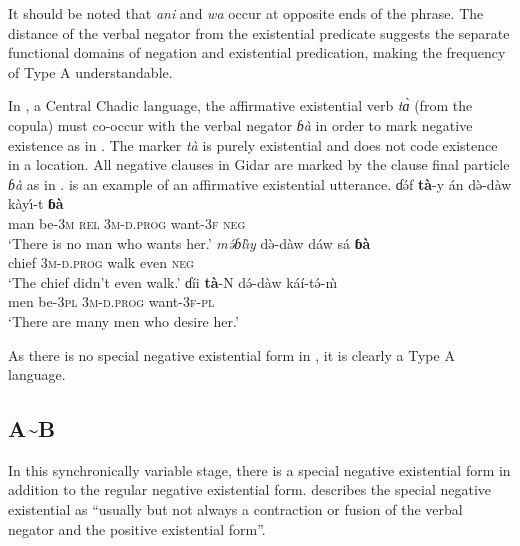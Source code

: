 \documentclass[output=paper]{langsci/langscibook}
\begin{document}
It should be noted that \textit{ani} and \textit{wa} occur at opposite ends of the phrase. The distance of the verbal negator from the existential predicate suggests the separate functional domains of negation and existential predication, making the frequency of Type A understandable.

In , a Central Chadic language, the affirmative existential verb \textit{t\`ɑ} (from the copula) must co-occur with the verbal negator \textit{ɓ\`a} in order to mark negative existence as in . The marker \textit{t\`a} is purely existential and does not code existence in a location. All negative clauses in Gidar are marked by the clause final particle \textit{ɓ\`a} as in .  is an example of an affirmative existential utterance.
\ea\label{ex:gidar-want-chief-desire}
\ea\label{ex:gidar-want}
\gll ɗ\'əf \textbf{t\`a}-y \'an d\`ə-d\`aw k\`ay\'\i-t \textbf{ɓ\`a}\\
man be-3\textsc{m} \textsc{rel} 3\textsc{m}-\textsc{d.prog} want-3\textsc{f} \textsc{neg}\\
\glt `There is no man who wants her.'
\ex\label{ex:gidar-chief}
\gll \textit{m\'əɓl{\`\i}y} d\`ə-d\`aw d\'aw s\'a \textbf{ɓ\`a}\\
chief 3\textsc{m}-\textsc{d.prog} walk even \textsc{neg}\\
\glt `The chief didn't even walk.'
\ex\label{ex:gidar-desire}
\gll ɗíi \textbf{t\`a}-N d\'ə-dà{\op}w{\cp} káí-t\'ə-n\`\i\\
men be-3\textsc{pl} 3\textsc{m}-\textsc{d.prog} want-3\textsc{f}-\textsc{pl}\\
\glt `There are many men who desire her.'
\z\z

As there is no special negative existential form in , it is clearly a Type A language. 

\subsection{A{\textasciitilde}B}\label{sec:3:3.2}

In this synchronically variable stage, there is a special negative existential form in addition to the regular negative existential form. \citet[7]{Croft1991} describes the special negative existential as ``usually but not always a contraction or fusion of the verbal negator and the positive existential form''.
\end{document}
